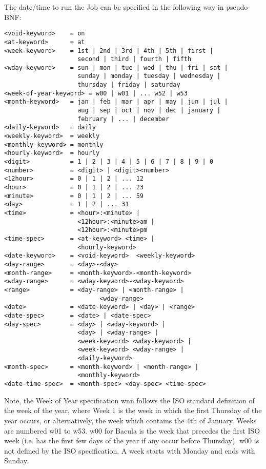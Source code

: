 \begin{description}
The date/time to run the Job can be specified in the following way  in
pseudo-BNF:  

\footnotesize
\begin{verbatim}
<void-keyword>    = on
<at-keyword>      = at
<week-keyword>    = 1st | 2nd | 3rd | 4th | 5th | first |
                    second | third | fourth | fifth
<wday-keyword>    = sun | mon | tue | wed | thu | fri | sat |
                    sunday | monday | tuesday | wednesday |
                    thursday | friday | saturday
<week-of-year-keyword> = w00 | w01 | ... w52 | w53
<month-keyword>   = jan | feb | mar | apr | may | jun | jul |
                    aug | sep | oct | nov | dec | january |
                    february | ... | december
<daily-keyword>   = daily
<weekly-keyword>  = weekly
<monthly-keyword> = monthly
<hourly-keyword>  = hourly
<digit>           = 1 | 2 | 3 | 4 | 5 | 6 | 7 | 8 | 9 | 0
<number>          = <digit> | <digit><number>
<12hour>          = 0 | 1 | 2 | ... 12
<hour>            = 0 | 1 | 2 | ... 23
<minute>          = 0 | 1 | 2 | ... 59
<day>             = 1 | 2 | ... 31
<time>            = <hour>:<minute> |
                    <12hour>:<minute>am |
                    <12hour>:<minute>pm
<time-spec>       = <at-keyword> <time> |
                    <hourly-keyword>
<date-keyword>    = <void-keyword>  <weekly-keyword>
<day-range>       = <day>-<day>
<month-range>     = <month-keyword>-<month-keyword>
<wday-range>      = <wday-keyword>-<wday-keyword>
<range>           = <day-range> | <month-range> |
                          <wday-range>
<date>            = <date-keyword> | <day> | <range>
<date-spec>       = <date> | <date-spec>
<day-spec>        = <day> | <wday-keyword> |
                    <day> | <wday-range> |
                    <week-keyword> <wday-keyword> |
                    <week-keyword> <wday-range> |
                    <daily-keyword>
<month-spec>      = <month-keyword> | <month-range> |
                    <monthly-keyword>
<date-time-spec>  = <month-spec> <day-spec> <time-spec>
\end{verbatim}
\normalsize

\end{description}

Note, the Week of Year specification wnn follows the ISO standard definition
of the week of the year, where Week 1 is the week in which the first Thursday
of the year occurs, or alternatively, the week which contains the 4th of
January. Weeks are numbered w01 to w53. w00 for Bacula is the week that
precedes the first ISO week (i.e. has the first few days of the year if any
occur before Thursday). w00 is not defined by the ISO specification. A week
starts with Monday and ends with Sunday. 

